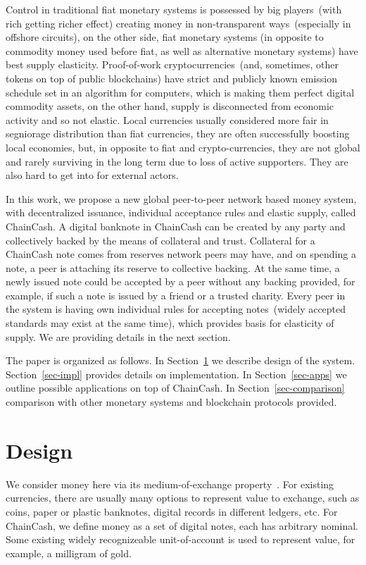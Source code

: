 \documentclass{llncs}   %
\newcommand{\cc}{ChainCash}
\begin{document}
Control in traditional fiat monetary systems is possessed by big players~(with rich getting richer effect) creating
money in non-transparent ways~(especially in offshore circuits), on the other side,
fiat monetary systems (in opposite to commodity money used before fiat, as well as alternative monetary systems) have
best supply elasticity. Proof-of-work cryptocurrencies~(and, sometimes, other tokens on top of public blockchains) have strict and
publicly known emission schedule set in an algorithm for computers, which is making them perfect digital commodity assets,
on the other hand, supply is disconnected from economic activity and so not elastic. Local currencies usually considered
more fair in segniorage distribution than fiat currencies, they are often successfully boosting local economies, but,
in opposite to fiat and crypto-currencies, they are not global and rarely surviving in the long term due to loss of active supporters.
They are also hard to get into for external actors.

In this work, we propose a new global peer-to-peer network based money system, with decentralized issuance, individual acceptance rules and elastic supply, called \cc{}.
A digital banknote in \cc{} can be created by any party and collectively backed by the means of collateral and trust. Collateral for a \cc{} note comes from reserves network peers may have, and on spending a note, a peer is attaching its
reserve to collective backing. At the same time, a newly issued note could be accepted by a peer without any backing provided, for example, if such a note is issued by a friend or a trusted charity. Every peer in the system is having own individual rules
for accepting notes~(widely accepted standards may exist at the same time), which provides basis for elasticity of supply. We are providing details in the next section.

The paper is organized as follows. In Section~\ref{sec-design} we describe design of the system. Section~\ref{sec-impl} provides
details on implementation. In Section~\ref{sec-apps} we outline possible applications on top of \cc{}. In Section~\ref{sec-comparison} comparison
 with other monetary systems and blockchain protocols provided.

\section{Design}
\label{sec-design}

We consider money here via its medium-of-exchange property~\cite{kiyotaki1989money}. For existing currencies, there are usually many options to represent value to exchange, such as coins, paper or plastic banknotes, digital records in different ledgers, etc. For \cc{}, we define money as a set of digital notes, each has arbitrary nominal. Some existing widely recognizeable unit-of-account is used to represent value, for example, a milligram of gold.
\end{document}

